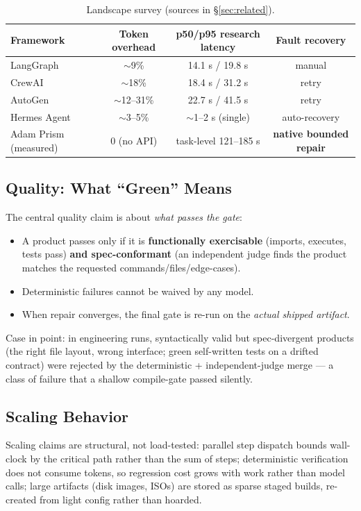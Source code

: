 \documentclass[11pt]{article}
\begin{document}
\begin{table}[h!t]\centering
\caption{Landscape survey (sources in \S\ref{sec:related}). \label{tab:landscape}}
\begin{tabular}{@{}lccc@{}}
\toprule
Framework & Token overhead & p50/p95 research latency & Fault recovery\\
\midrule
LangGraph & $\sim$9\% & 14.1 s / 19.8 s & manual\\
CrewAI & $\sim$18\% & 18.4 s / 31.2 s & retry\\
AutoGen & $\sim$12--31\% & 22.7 s / 41.5 s & retry\\
Hermes Agent & $\sim$3--5\% & $\sim$1--2 s (single) & auto-recovery\\
Adam Prism (measured) & 0 (no API) & task-level 121--185 s & \textbf{native bounded repair}\\
\bottomrule
\end{tabular}
\end{table}


\subsection{Quality: What ``Green'' Means}
The central quality claim is about \emph{what passes the gate}:
\begin{itemize}
  \item A product passes only if it is \textbf{functionally exercisable} (imports,
        executes, tests pass) \textbf{and spec-conformant} (an independent judge finds the
        product matches the requested commands/files/edge-cases).
  \item Deterministic failures cannot be waived by any model.
  \item When repair converges, the final gate is re-run on the \emph{actual shipped
        artifact}.
\end{itemize}
Case in point: in engineering runs, syntactically valid but spec-divergent products (the
right file layout, wrong interface; green self-written tests on a drifted contract) were
rejected by the deterministic + independent-judge merge --- a class of failure that a
shallow compile-gate passed silently.

\subsection{Scaling Behavior}
Scaling claims are structural, not load-tested: parallel step dispatch bounds wall-clock
by the critical path rather than the sum of steps; deterministic verification does not
consume tokens, so regression cost grows with work rather than model calls; large
artifacts (disk images, ISOs) are stored as sparse staged builds, re-created from light
config rather than hoarded.
\end{document}
